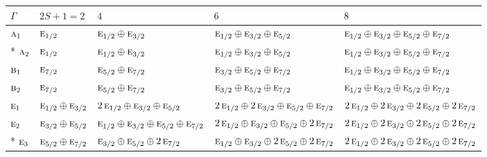 \documentclass[10pt,a4paper]{article}
\numberwithin{equation}{section}
\newcommand{\irr}[1]{\text{\normalfont\scshape #1}}
\begin{document}
{\small\setlength{\tabcolsep}{3pt}\begin{longtable}{@{}l>{\RaggedRight\arraybackslash}p{}>{\RaggedRight\arraybackslash}p{}>{\RaggedRight\arraybackslash}p{}>{\RaggedRight\arraybackslash}p{}@{}}\toprule
$\Gamma$ & $2S + 1 = 2$ & $4$ & $6$ & $8$\\\midrule\endhead
\bottomrule\endfoot\endlastfoot
$\irr{a}_{1}$ & $\irr{e}_{1/2}$ & $\irr{e}_{1/2}\oplus \irr{e}_{3/2}$ & $\irr{e}_{1/2}\oplus \irr{e}_{3/2}\oplus \irr{e}_{5/2}$ & $\irr{e}_{1/2}\oplus \irr{e}_{3/2}\oplus \irr{e}_{5/2}\oplus \irr{e}_{7/2}$\\*
$\irr{a}_{2}$ & $\irr{e}_{1/2}$ & $\irr{e}_{1/2}\oplus \irr{e}_{3/2}$ & $\irr{e}_{1/2}\oplus \irr{e}_{3/2}\oplus \irr{e}_{5/2}$ & $\irr{e}_{1/2}\oplus \irr{e}_{3/2}\oplus \irr{e}_{5/2}\oplus \irr{e}_{7/2}$\\
$\irr{b}_{1}$ & $\irr{e}_{7/2}$ & $\irr{e}_{5/2}\oplus \irr{e}_{7/2}$ & $\irr{e}_{3/2}\oplus \irr{e}_{5/2}\oplus \irr{e}_{7/2}$ & $\irr{e}_{1/2}\oplus \irr{e}_{3/2}\oplus \irr{e}_{5/2}\oplus \irr{e}_{7/2}$\\
$\irr{b}_{2}$ & $\irr{e}_{7/2}$ & $\irr{e}_{5/2}\oplus \irr{e}_{7/2}$ & $\irr{e}_{3/2}\oplus \irr{e}_{5/2}\oplus \irr{e}_{7/2}$ & $\irr{e}_{1/2}\oplus \irr{e}_{3/2}\oplus \irr{e}_{5/2}\oplus \irr{e}_{7/2}$\\
$\irr{e}_{1}$ & $\irr{e}_{1/2}\oplus \irr{e}_{3/2}$ & $2\,\irr{e}_{1/2}\oplus \irr{e}_{3/2}\oplus \irr{e}_{5/2}$ & $2\,\irr{e}_{1/2}\oplus 2\,\irr{e}_{3/2}\oplus \irr{e}_{5/2}\oplus \irr{e}_{7/2}$ & $2\,\irr{e}_{1/2}\oplus 2\,\irr{e}_{3/2}\oplus 2\,\irr{e}_{5/2}\oplus 2\,\irr{e}_{7/2}$\\
$\irr{e}_{2}$ & $\irr{e}_{3/2}\oplus \irr{e}_{5/2}$ & $\irr{e}_{1/2}\oplus \irr{e}_{3/2}\oplus \irr{e}_{5/2}\oplus \irr{e}_{7/2}$ & $2\,\irr{e}_{1/2}\oplus \irr{e}_{3/2}\oplus \irr{e}_{5/2}\oplus 2\,\irr{e}_{7/2}$ & $2\,\irr{e}_{1/2}\oplus 2\,\irr{e}_{3/2}\oplus 2\,\irr{e}_{5/2}\oplus 2\,\irr{e}_{7/2}$\\*
$\irr{e}_{3}$ & $\irr{e}_{5/2}\oplus \irr{e}_{7/2}$ & $\irr{e}_{3/2}\oplus \irr{e}_{5/2}\oplus 2\,\irr{e}_{7/2}$ & $\irr{e}_{1/2}\oplus \irr{e}_{3/2}\oplus 2\,\irr{e}_{5/2}\oplus 2\,\irr{e}_{7/2}$ & $2\,\irr{e}_{1/2}\oplus 2\,\irr{e}_{3/2}\oplus 2\,\irr{e}_{5/2}\oplus 2\,\irr{e}_{7/2}$\\
\bottomrule\end{longtable}}
\end{document}
